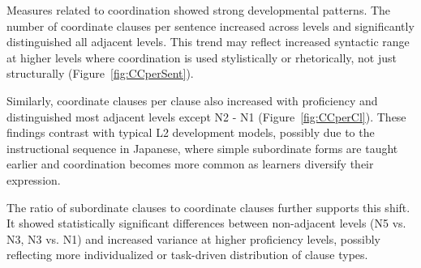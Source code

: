 
Measures related to coordination showed strong developmental patterns. The number of coordinate clauses per sentence
increased across levels and significantly
distinguished all adjacent levels. This trend may reflect increased syntactic range at higher levels where
coordination is used stylistically or rhetorically, not just structurally (Figure~\ref{fig:CCperSent}).

Similarly, coordinate clauses per clause also increased with proficiency and distinguished most adjacent levels
except N2 - N1 (Figure~\ref{fig:CCperCl}). These findings contrast with typical L2 development models, possibly due
to the instructional sequence in Japanese, where simple subordinate forms are taught earlier and coordination
becomes more common as learners diversify their expression.

The ratio of subordinate clauses to
coordinate clauses further supports this shift. It showed statistically significant differences between non-adjacent
levels (N5 vs. N3, N3 vs. N1) and increased variance at higher proficiency levels, possibly reflecting more
individualized or task-driven distribution of clause types.

